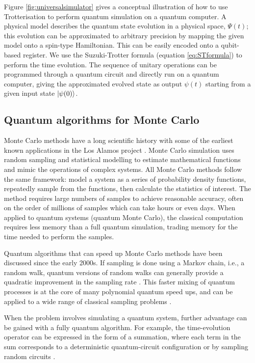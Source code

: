 \documentclass[10pt]{iopart}
\begin{document}
Figure \ref{fig:universalsimulator} gives a conceptual illustration of how to use Trotterisation to perform quantum simulation on a quantum computer. A physical model describes the quantum state evolution in a physical space, $\Psi(t)$; this evolution can be approximated to arbitrary precision by mapping the given model onto a spin-type Hamiltonian. This can be easily encoded onto a qubit-based register. We use the Suzuki-Trotter formula (equation \eqref{eq:STformula}) to perform the time evolution. The sequence of unitary operations can be programmed through a quantum circuit and directly run on a quantum computer, giving the approximated evolved state as output $\psi(t)$ starting from a given input state $\ket{\psi(0)}$.

\subsection{Quantum algorithms for Monte Carlo}\label{ssec:QMC}

Monte Carlo methods have a long scientific history with some of the earliest known applications in the Los Alamos project \cite{Eckhardt1987}. Monte Carlo simulation uses random sampling and statistical modelling to estimate mathematical functions and mimic the operations of complex systems. All Monte Carlo methods follow the same framework: model a system as a series of probability density functions, repeatedly sample from the functions, then calculate the statistics of interest. 
The method requires large numbers of samples to achieve reasonable accuracy, often on the order of millions of samples which can take hours or even days. When applied to quantum systems (quantum Monte Carlo), the classical computation requires less memory than a full quantum simulation, trading memory for the time needed to perform the samples.

Quantum algorithms that can speed up Monte Carlo methods have been discussed since the early 2000s. If sampling is done using a Markov chain, i.e., a random walk, quantum versions of random walks \cite{VenegasAndraca2012} can generally provide a quadratic improvement in the sampling rate \cite{Szegedy2004}.  This faster mixing of quantum processes is at the core of many polynomial quantum speed ups, and can be applied to a wide range of classical sampling problems \cite{Montanaro2015}.

When the problem involves simulating a quantum system, further advantage can be gained with a fully quantum algorithm.  For example, the time-evolution operator can be expressed in the form of a summation, where each term in the sum corresponds to a deterministic quantum-circuit configuration \cite{Berry2015,Childs2012} or by sampling random circuits \cite{Campbell2019r}. 
\end{document}
